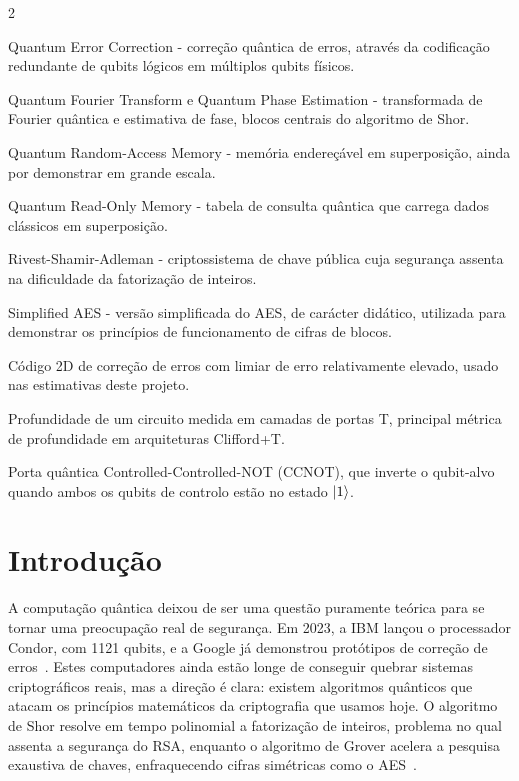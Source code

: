 \documentclass[11pt,a4paper]{article}
\begin{document}
\begin{multicols}{2}
\begin{description}[style=nextline, leftmargin=0.9em, font=\small\bfseries, itemsep=2pt, topsep=1pt]
\item[QEC] Quantum Error Correction - correção quântica de erros, através da codificação redundante de qubits lógicos em múltiplos qubits físicos.
\item[QFT / QPE] Quantum Fourier Transform e Quantum Phase Estimation - transformada de Fourier quântica e estimativa de fase, blocos centrais do algoritmo de Shor.
\item[qRAM] Quantum Random-Access Memory -  memória endereçável em superposição, ainda por demonstrar em grande escala.
\item[QROM] Quantum Read-Only Memory - tabela de consulta quântica que carrega dados clássicos em superposição.
\item[RSA] Rivest-Shamir-Adleman -  criptossistema de chave pública cuja segurança assenta na dificuldade da fatorização de inteiros.
\item[S-AES] Simplified AES - versão simplificada do AES, de carácter didático, utilizada para demonstrar os princípios de funcionamento de cifras de blocos.
\item[Surface Code] Código 2D de correção de erros com limiar de erro relativamente elevado, usado nas estimativas deste projeto.
\item[T-depth] Profundidade de um circuito medida em camadas de portas T, principal métrica de profundidade em arquiteturas Clifford+T.
\item[Toffoli] Porta quântica Controlled-Controlled-NOT (CCNOT), que inverte o qubit-alvo quando ambos os qubits de controlo estão no estado $\ket{1}$.
\end{description}
\end{multicols}

\clearpage

\section{Introdução}\label{sec:intro}

A computação quântica deixou de ser uma questão puramente teórica para se tornar uma preocupação real de segurança. Em 2023, a IBM lançou o processador Condor, com 1121 qubits, e a Google já demonstrou protótipos de correção de erros~\cite{oonishi2026}. Estes computadores ainda estão longe de conseguir quebrar sistemas criptográficos reais, mas a direção é clara: existem algoritmos quânticos que atacam os princípios matemáticos da criptografia que usamos hoje. O algoritmo de Shor resolve em tempo polinomial a fatorização de inteiros, problema no qual assenta a segurança do RSA, enquanto o algoritmo de Grover acelera a pesquisa exaustiva de chaves, enfraquecendo cifras simétricas como o AES~\cite{wang2022,chethana2025}.
\end{document}
